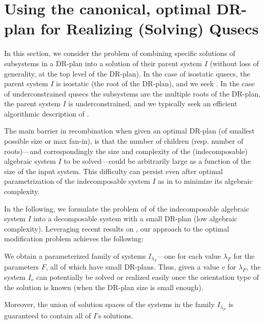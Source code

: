 \section{Using the canonical, optimal DR-plan for Realizing (Solving) Qusecs}
\label{sec:recomb}
%
In this section, we consider the  problem of combining specific solutions of subsystems in a DR-plan into a solution of their parent system $I$ (without loss of generality, at the top level of the DR-plan). In the case of isostatic qusecs, the parent system $I$ is isostatic (the root of the DR-plan), and we seek . In the case of underconstrained qusecs the subsystems are the multiple roots of the DR-plan, the parent system $I$ is underconstrained, and we typically seek an efficient algorithmic description of .

The main barrier in recombination when given an optimal DR-plan (of smallest possible size or max fan-in),  is that the number of children (resp. number of roots)---and correspondingly the  size and complexity of the (indecomposable) algebraic system $I$ to be solved---could be arbitrarily large as a function of the size of the input system. This difficulty can persist even after optimal parametrization of the indecomposable system $I$ as in \cite{sitharam2010optimized} to minimize its algebraic complexity.

In the following, we formulate the problem of \cutout{,} of the indecomposable algebraic system $I$ into a decomposable system with a small DR-plan (low algebraic complexity). Leveraging recent results on , our approach to the optimal modification problem achieves the following:

\medskip\noindent
{}
We obtain a  parameterized family of systems $I_{\lambda_F}$---one for each value $\lambda_F$ for the parameters $F$,  all of which have small DR-plans. Thus, given a value $v$ for $\lambda_F$, the system $I_v$ can potentially be solved or realized easily once the orientation type of the solution is known  (when the DR-plan size is small enough).

\medskip\noindent
{}
Moreover, the union of solution spaces of the systems in the family $I_{\lambda_F}$ is guaranteed to contain all of $I$'s solutions.

